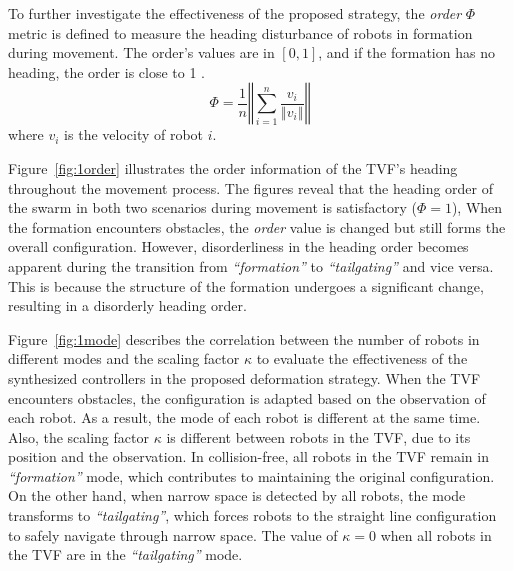To further investigate the effectiveness of the proposed strategy, the \textit{order} $\Phi$ metric is defined to measure the heading disturbance of robots in formation during movement. The order's values are in $\left[0,1\right]$, and if the formation has no heading, the order is close to 1 \cite{Vicsek1995}.
\begin{equation}
    \Phi=\dfrac{1}{n}\left\Vert\sum_{i=1}^n{\dfrac{v_i}{\left\Vert v_i\right\Vert}}\right\Vert
\end{equation}
where $v_i$ is the velocity of robot $i$.

Figure~\ref{fig:1order} illustrates the order information of the TVF's heading throughout the movement process. The figures reveal that the heading order of the swarm in both two scenarios during movement is satisfactory ($\Phi = 1$), When the formation encounters obstacles, the \textit{order} value is changed but still forms the overall configuration. However, disorderliness in the heading order becomes apparent during the transition from \textit{``formation''} to \textit{``tailgating''} and vice versa. This is because the structure of the formation undergoes a significant change, resulting in a disorderly heading order.

Figure~\ref{fig:1mode} describes the correlation between the number of robots in different modes and the scaling factor $\kappa$ to evaluate the effectiveness of the synthesized controllers in the proposed deformation strategy. When the TVF encounters obstacles, the configuration is adapted based on the observation of each robot. As a result, the mode of each robot is different at the same time. Also, the scaling factor $\kappa$ is different between robots in the TVF, due to its position and the observation. In collision-free, all robots in the TVF remain in \textit{``formation''} mode, which contributes to maintaining the original configuration. On the other hand, when narrow space is detected by all robots, the mode transforms to \textit{``tailgating''}, which forces robots to the straight line configuration to safely navigate through narrow space. The value of $\kappa=0$ when all robots in the TVF are in the \textit{``tailgating''} mode.

